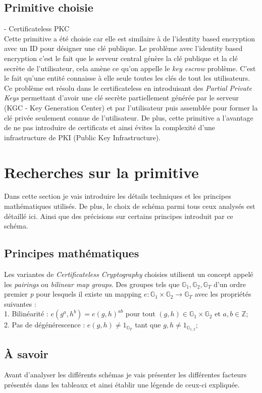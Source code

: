 \subsection{Primitive choisie}
- Certificateless PKC~\cite{DBLP:conf/asiacrypt/Al-RiyamiP03}\\
 Cette primitive a été choisie car elle est similaire à de l'identity based encryption avec un ID pour désigner une clé publique. Le problème avec l'identity based encryption c'est le fait que le serveur central génère la clé publique et la clé secrète de l'utilisateur, cela amène ce qu'on appelle le \textit{key escrow} problème. C'est le fait qu'une entité connaisse à elle seule toutes les clés de tout les utilisateurs. Ce problème est résolu dans le certificateless en introduisant des \textit{Partial Private Keys} permettant d'avoir une clé secrète partiellement générée par le serveur (KGC - Key Generation Center) et par l'utilisateur puis assemblée pour former la clé privée seulement connue de l'utilisateur. De plus, cette primitive a l'avantage de ne pas introduire de certificats et ainsi évites la complexité d'une infrastructure de PKI (Public Key Infrastructure).
\section{Recherches sur la primitive}
\label{sec:primitiveSearch}
Dans cette section je vais introduire les détails techniques et les principes mathématiques utilisés. De plus, le choix de schéma parmi tous ceux analysés est détaillé ici. Ainsi que des précisions sur certains principes introduit par ce schéma.
\subsection{Principes mathématiques}
Les variantes de \textit{Certificateless Cryptography} choisies utilisent un concept appelé les \textit{pairings} ou \textit{bilinear map groups}.
Des groupes tels que $\mathbb{G}_1, \mathbb{G}_2, \mathbb{G}_T$ d'un ordre premier \textit{p} pour lesquels il existe un mapping $e : \mathbb{G}_1 \times \mathbb{G}_2 \rightarrow \mathbb{G}_T$ avec les propriétés suivantes :\\
1. Bilinéarité : $e(g^a, h^b) = e(g, h)^{ab}$ pour tout $(g,h) \in \mathbb{G}_1 \times \mathbb{G}_2$ et $a,b \in \mathbb{Z}$;\\
2. Pas de dégénérescence : $e(g,h) \neq 1_{\mathbb{G}_T} $ tant que $g,h \neq 1_{\mathbb{G}_{1,2}}$;
\subsection{À savoir}
\label{subsec:asavoir}
Avant d'analyser les différents schémas je vais présenter les différentes facteurs présentés dans les tableaux et ainsi établir une légende de ceux-ci expliquée.
